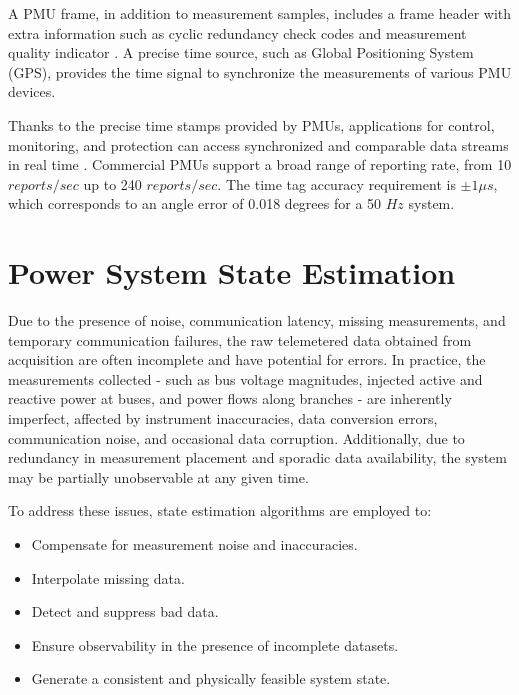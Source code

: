 A PMU frame, in addition to measurement samples, includes a frame header with extra information such as cyclic redundancy check codes and measurement quality indicator \autocite{6111222}. A precise time source, such as Global Positioning System (GPS), provides the time signal to synchronize the measurements of various PMU devices.

Thanks to the precise time stamps provided by PMUs, applications for control, monitoring, and protection can access synchronized and comparable data streams in real time \autocite{5447627}. Commercial PMUs support a broad range of reporting rate, from 10 $reports/sec$ up to 240 $reports/sec$. The time tag accuracy requirement is $\pm1\mu s$, which corresponds to an angle error of 0.018 degrees for a 50 $Hz$ system.

\section{Power System State Estimation}\label{sec:ch1/sec3}

Due to the presence of noise, communication latency, missing measurements, and temporary communication failures, the raw telemetered data obtained from acquisition are often incomplete and have potential for errors. In practice, the measurements collected - such as bus voltage magnitudes, injected active and reactive power at buses, and power flows along branches - are inherently imperfect, affected by instrument inaccuracies, data conversion errors, communication noise, and occasional data corruption. Additionally, due to redundancy in measurement placement and sporadic data availability, the system may be partially unobservable at any given time.

To address these issues, state estimation algorithms are employed to:
\begin{itemize}
    \item Compensate for measurement noise and inaccuracies.
    \item Interpolate missing data.
    \item Detect and suppress bad data.
    \item Ensure observability in the presence of incomplete datasets.
    \item Generate a consistent and physically feasible system state.
\end{itemize}

